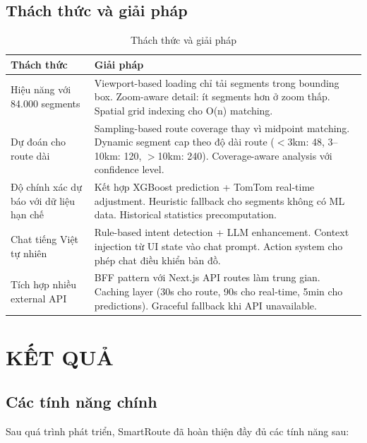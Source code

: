 \documentclass[12pt,a4paper]{article}
\begin{document}
\subsection{Thách thức và giải pháp}
\begin{table}[H]
\centering
\caption{Thách thức và giải pháp}
\begin{tabularx}{\textwidth}{L{4cm}Y}
\toprule
\textbf{Thách thức} & \textbf{Giải pháp} \\
\midrule
Hiệu năng với 84.000 segments & Viewport-based loading chỉ tải segments trong bounding box. Zoom-aware detail: ít segments hơn ở zoom thấp. Spatial grid indexing cho O(n) matching. \\[6pt]
Dự đoán cho route dài & Sampling-based route coverage thay vì midpoint matching. Dynamic segment cap theo độ dài route ($<$3km: 48, 3--10km: 120, $>$10km: 240). Coverage-aware analysis với confidence level. \\[6pt]
Độ chính xác dự báo với dữ liệu hạn chế & Kết hợp XGBoost prediction + TomTom real-time adjustment. Heuristic fallback cho segments không có ML data. Historical statistics precomputation. \\[6pt]
Chat tiếng Việt tự nhiên & Rule-based intent detection + LLM enhancement. Context injection từ UI state vào chat prompt. Action system cho phép chat điều khiển bản đồ. \\[6pt]
Tích hợp nhiều external API & BFF pattern với Next.js API routes làm trung gian. Caching layer (30s cho route, 90s cho real-time, 5min cho predictions). Graceful fallback khi API unavailable. \\
\bottomrule
\end{tabularx}
\end{table}

\section{KẾT QUẢ}

\subsection{Các tính năng chính}
Sau quá trình phát triển, SmartRoute đã hoàn thiện đầy đủ các tính năng sau:
\end{document}
